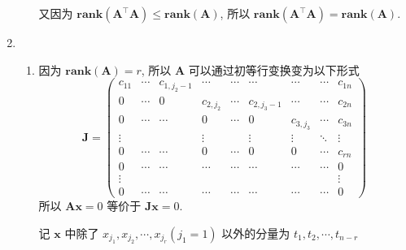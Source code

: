 \documentclass[11pt,letter,notitlepage]{article}
\newcommand{\rank}[1]{ \textbf{rank}  (#1)  }
\begin{document}
\begin{solution}
\begin{enumerate}
\begin{enumerate}
                        又因为 $\rank{\mathbf{A}^\top\mathbf{A}}\leq \rank{\mathbf{A}}$, 所以 $\rank{\mathbf{A}^\top\mathbf{A}}=\rank{\mathbf{A}}$.
              \end{enumerate}
        \item \begin{enumerate}
                  \item 因为 $\rank{\mathbf{A}}=r$, 所以 $\mathbf{A}$ 可以通过初等行变换变为以下形式
                        $$\mathbf{J}=\begin{pmatrix}
                                c_{11} & \cdots & c_{1,j_2 -1} & \cdots    & \cdots & \cdots       & \cdots    & \cdots & c_{1n} \\
                                0      & \cdots & 0            & c_{2,j_2} & \cdots & c_{2,j_3 -1} & \cdots    & \cdots & c_{2n} \\
                                0      & \cdots & \cdots       & 0         & \cdots & 0            & c_{3,j_3} & \cdots & c_{3n} \\
                                \vdots &        &              & \vdots    &        & \vdots       & \vdots    & \ddots & \vdots \\
                                0      & \cdots & \cdots       & 0         & \cdots & 0            & 0         & \cdots & c_{rn} \\
                                0      & \cdots & \cdots       & \cdots    & \cdots & \cdots       & \cdots    & \cdots & 0      \\
                                \vdots &        &              &           &        &              &           &        & \vdots \\
                                0      & \cdots & \cdots       & \cdots    & \cdots & \cdots       & \cdots    & \cdots & 0
                            \end{pmatrix}$$
                        所以 $\mathbf{Ax}=0$ 等价于 $\mathbf{Jx}=0$.

                        记 $\mathbf{x}$ 中除了 $x_{j_1}, x_{j_2}, \cdots, x_{j_r} (j_1=1)$ 以外的分量为 $t_1, t_2, \cdots, t_{n-r}$


\end{enumerate}
\end{enumerate}
\end{solution}
\end{document}
